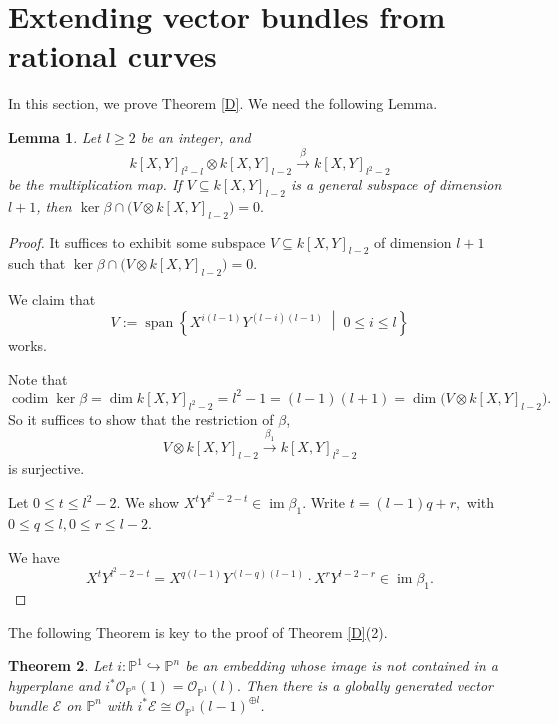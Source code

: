 \documentclass[11pt,letterpaper]{amsart}
\newtheorem{lemma}{Lemma}[section]
\newtheorem{theorem}[lemma]{Theorem}
\begin{document}
\section{Extending vector bundles from rational curves}
In this section, we prove Theorem \ref{D}. We need the following Lemma.
\begin{lemma}\label{algebra 2}
Let $l \geq 2$ be an integer, and
\[
k[X,Y]_{l^2-l}\otimes k[X,Y]_{l-2}
\xrightarrow{\ \beta\ }
k[X,Y]_{l^2-2}
\]
be the multiplication map. If $V \subseteq k[X,Y]_{l-2}$
is a general subspace of dimension $l+1$, then $\ker \beta \cap \bigl(V\otimes k[X,Y]_{l-2}\bigr)=0.$
\end{lemma}

\begin{proof}
It suffices to exhibit some subspace $V \subseteq k[X,Y]_{l-2}$
of dimension $l+1$ such that $\ker \beta \cap \bigl(V\otimes k[X,Y]_{l-2}\bigr)=0.$

We claim that
\[
V:=\operatorname{span}
\left\{
X^{i(l-1)}Y^{(l-i)(l-1)}
\;\middle|\;
0\le i\le l
\right\}
\]
works.

Note that
\[
\operatorname{codim}\ker\beta
=
\dim k[X,Y]_{l^2-2}
=
l^2-1
=
(l-1)(l+1)
=
\dim\bigl(V\otimes k[X,Y]_{l-2}\bigr).
\]
So it suffices to show that the restriction of $\beta$,
\[
V\otimes k[X,Y]_{l-2}
\xrightarrow{\ \beta_1\ }
k[X,Y]_{l^2-2}
\]
is surjective.

Let $0\le t\le l^2-2.$
We show $X^tY^{l^2-2-t}\in \operatorname{im}\beta_1.$
Write $t=(l-1)q+r,$ with $0\le q\le l, 0\le r\le l-2.$

We have
\[
X^tY^{l^2-2-t}
=
X^{q(l-1)}Y^{(l-q)(l-1)}
\cdot
X^rY^{l-2-r}
\in \operatorname{im}\beta_1.
\]
\end{proof}
The following Theorem is key to the proof of Theorem \ref{D}(2).
\begin{theorem}\label{key}
Let $i:\mathbb{P}^1 \hookrightarrow \mathbb{P}^n$
be an embedding whose image is not contained in a hyperplane and $i^*\mathcal{O}_{\mathbb{P}^n}(1)=\mathcal{O}_{\mathbb{P}^1}(l).$
Then there is a globally generated vector bundle $\mathcal{E}$ on $\mathbb{P}^n$ with $i^*\mathcal{E} \cong \mathcal{O}_{\mathbb{P}^1}(l-1)^{\oplus l}$.
\end{theorem}
\end{document}
